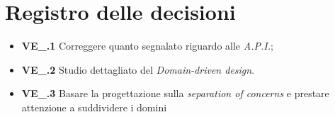 \section{Registro delle decisioni}
\begin{itemize}
	\item \textbf{VE\_\Data.1} Correggere quanto segnalato riguardo alle \textit{A.P.I.}; 
	\item \textbf{VE\_\Data.2} Studio dettagliato del \textit{Domain-driven design}.
	\item \textbf{VE\_\Data.3} Basare la progettazione sulla \textit{separation of concerns} e prestare attenzione a suddividere i domini
\end{itemize}
